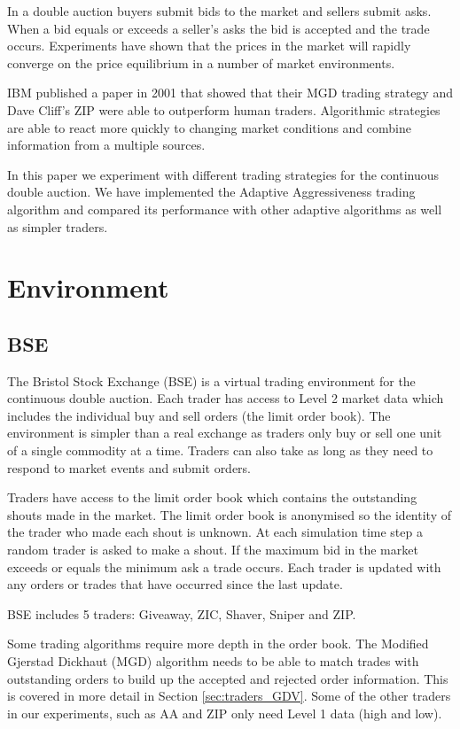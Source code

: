 \documentclass[preprint]{acm_proc_article-sp} %
\begin{document}
In a double auction buyers submit bids to the market and sellers submit asks.
When a bid equals or exceeds a seller's asks the bid is accepted and the trade
occurs. Experiments have shown  that the prices in the market will
rapidly converge on the price equilibrium in a number of market
environments\cite{smith_1962}.

IBM published a paper in 2001 that showed that their MGD trading strategy and
Dave Cliff's ZIP were able to outperform human traders\cite{ibm_human}.
Algorithmic strategies are able to react more quickly to changing market
conditions and combine information from a multiple sources.

In this paper we experiment with different trading strategies for the
continuous double auction.
We have implemented the Adaptive Aggressiveness\cite{AA_thesis} trading
algorithm and compared its performance with other adaptive algorithms as well
as simpler traders.\\


\section{Environment} \label{sec:environment}
\subsection{BSE} \label{sec:BSE}
The Bristol Stock Exchange (BSE) is a virtual trading environment for the
continuous double auction. Each trader has access to Level 2 market data which
includes the individual buy and sell orders (the limit order book). The
environment is simpler than a real exchange as traders only buy or sell one
unit of a single commodity at a time. Traders can also take as long as they
need to respond to market events and submit orders.

Traders have access to the limit order book which contains the outstanding
shouts made in the market. The limit order book is anonymised so the identity
of the trader who made each shout is unknown. At each simulation time step a
random trader is asked to make a shout. If the maximum bid in the market
exceeds or equals the minimum ask a trade occurs. Each trader is updated with
any orders or trades that have occurred since the last update.

BSE includes 5 traders: Giveaway, ZIC, Shaver, Sniper and ZIP.

Some trading algorithms require more depth in the order book. The Modified
Gjerstad Dickhaut (MGD) algorithm needs to be able to match trades with
outstanding orders to build up the accepted and rejected order information.
This is covered in more detail in Section \ref{sec:traders_GDV}. Some of the
other traders in our experiments, such as AA and ZIP only need Level 1 data
(high and low).
\end{document}
